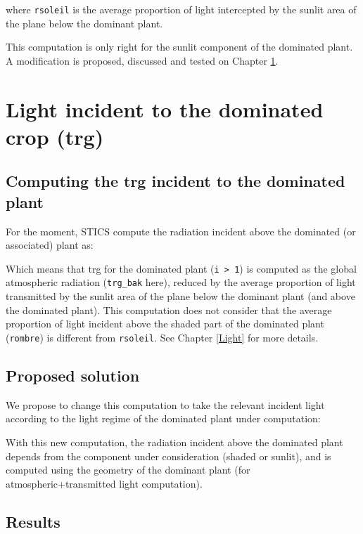 \documentclass[]{book}
\begin{document}
where \texttt{rsoleil} is the average proportion of light intercepted by the sunlit area of the plane below the dominant plant.

This computation is only right for the sunlit component of the dominated plant. A modification is proposed, discussed and tested on Chapter \ref{trg}.

\hypertarget{trg}{%
\chapter{Light incident to the dominated crop (trg)}\label{trg}}

\hypertarget{computing-the-trg-incident-to-the-dominated-plant}{%
\section{Computing the trg incident to the dominated plant}\label{computing-the-trg-incident-to-the-dominated-plant}}

For the moment, STICS compute the radiation incident above the dominated (or associated) plant as:

Which means that trg for the dominated plant (\texttt{i\ \textgreater{}\ 1}) is computed as the global atmospheric radiation (\texttt{trg\_bak} here), reduced by the average proportion of light transmitted by the sunlit area of the plane below the dominant plant (and above the dominated plant).
This computation does not consider that the average proportion of light incident above the shaded part of the dominated plant (\texttt{rombre}) is different from \texttt{rsoleil}. See Chapter \ref{Light} for more details.

\hypertarget{proposed-solution}{%
\section{Proposed solution}\label{proposed-solution}}

We propose to change this computation to take the relevant incident light according to the light regime of the dominated plant under computation:

With this new computation, the radiation incident above the dominated plant depends from the component under consideration (shaded or sunlit), and is computed using the geometry of the dominant plant (for atmospheric+transmitted light computation).

\hypertarget{results}{%
\section{Results}\label{results}}
\end{document}
